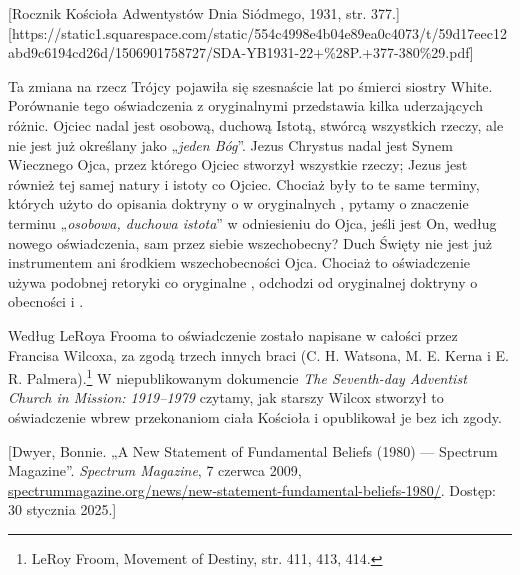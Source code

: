 [Rocznik Kościoła Adwentystów Dnia Siódmego, 1931, str. 377.][https://static1.squarespace.com/static/554c4998e4b04e89ea0c4073/t/59d17eec12abd9c6194cd26d/1506901758727/SDA-YB1931-22+\%28P.+377-380\%29.pdf]

Ta zmiana na rzecz Trójcy pojawiła się szesnaście lat po śmierci siostry White. Porównanie tego oświadczenia z oryginalnymi  przedstawia kilka uderzających różnic. Ojciec nadal jest osobową, duchową Istotą, stwórcą wszystkich rzeczy, ale nie jest już określany jako „\textit{jeden Bóg}”. Jezus Chrystus nadal jest Synem Wiecznego Ojca, przez którego Ojciec stworzył wszystkie rzeczy; Jezus jest również tej samej natury i istoty co Ojciec. Chociaż były to te same terminy, których użyto do opisania doktryny o  w oryginalnych , pytamy o znaczenie terminu „\textit{osobowa, duchowa istota}” w odniesieniu do Ojca, jeśli jest On, według nowego oświadczenia, sam przez siebie wszechobecny? Duch Święty nie jest już instrumentem ani środkiem wszechobecności Ojca. Chociaż to oświadczenie używa podobnej retoryki co oryginalne , odchodzi od oryginalnej doktryny o obecności i .

Według LeRoya Frooma to oświadczenie zostało napisane w całości przez Francisa Wilcoxa, za zgodą trzech innych braci (C. H. Watsona, M. E. Kerna i E. R. Palmera).\footnote{LeRoy Froom, Movement of Destiny, str. 411, 413, 414.} W niepublikowanym dokumencie \textit{The Seventh-day Adventist Church in Mission: 1919--1979} czytamy, jak starszy Wilcox stworzył to oświadczenie wbrew przekonaniom ciała Kościoła i opublikował je bez ich zgody.

[Dwyer, Bonnie. „A New Statement of Fundamental Beliefs (1980) — Spectrum Magazine”. \textit{Spectrum Magazine}, 7 czerwca 2009, \href{https://spectrummagazine.org/news/new-statement-fundamental-beliefs-1980/}{spectrummagazine.org/news/new-statement-fundamental-beliefs-1980/}. Dostęp: 30 stycznia 2025.]

